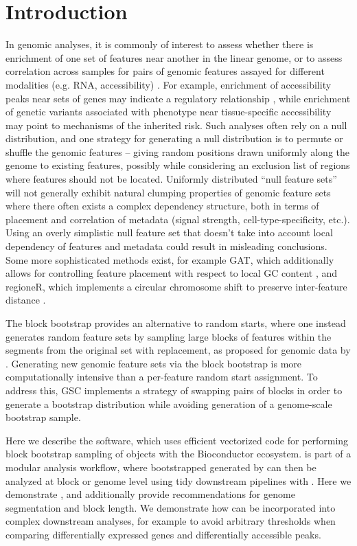 \section{Introduction}
In genomic analyses, it is commonly of interest to assess whether
there is enrichment of one set of features near another in the
linear genome, or to assess correlation across samples for pairs of
genomic features assayed for different modalities (e.g. RNA,
accessibility) \citep{reviewdilemma2014}.
For example, enrichment of accessibility peaks near sets of genes may
indicate a regulatory relationship \citep{lee2020fluent}, while
enrichment of genetic variants associated with phenotype near
tissue-specific accessibility may point to mechanisms of the inherited
risk.
Such analyses often rely on a null distribution, and one strategy for
generating a null distribution is to permute or shuffle the
genomic features -- giving random positions drawn uniformly along the
genome to existing features, possibly while considering an exclusion
list of regions where features should not be located.
Uniformly distributed ``null feature sets'' will not generally exhibit
natural clumping properties of
genomic feature sets where there often exists a complex
dependency structure, both in terms of placement and correlation of
metadata (signal strength, cell-type-specificity, etc.).
Using an overly simplistic null feature set that doesn't take into
account local dependency of features and metadata could result in
misleading conclusions.
Some more sophisticated methods exist, for example
GAT, which additionally allows for controlling feature placement with
respect to local GC content
\citep{GAT_2013}, and regioneR, which implements a circular chromosome
shift to preserve inter-feature distance \citep{gel2016regioner}.

The block bootstrap \citep{politis1999subsampling}
provides an alternative to random starts, where one instead generates
random feature sets by sampling large blocks of features within the
segments from the original set with replacement, as proposed for genomic data
by \citet{bickel2010subsampling}.
Generating new genomic feature sets via the block bootstrap is more
computationally intensive than a per-feature random start assignment.
To address this, GSC \citep{bickel2010subsampling} implements a
strategy of swapping pairs of blocks in order to generate a bootstrap
distribution while avoiding generation of a genome-scale bootstrap
sample.

Here we describe the \bootranges software, which uses efficient
vectorized code for performing block bootstrap sampling of
\granges \citep{lawrence2013software} objects with the Bioconductor
ecosystem.
\bootranges is part of a modular analysis workflow, where bootstrapped
\granges generated by \bootranges can then be analyzed at block or
genome level using tidy downstream pipelines with \plyranges
\citep{lee2019plyranges}.
Here we demonstrate \bootranges, and additionally provide
recommendations for genome segmentation and block length.
We demonstrate how \bootranges can be incorporated into complex
downstream analyses, for example to avoid arbitrary thresholds when
comparing differentially expressed genes and differentially accessible
peaks.


